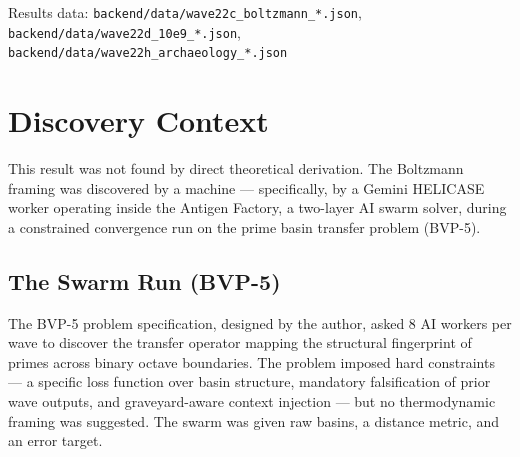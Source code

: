 \documentclass[
  11pt,
]{article}
\begin{document}
Results data: \texttt{backend/data/wave22c\_boltzmann\_*.json},
\texttt{backend/data/wave22d\_10e9\_*.json},
\texttt{backend/data/wave22h\_archaeology\_*.json}

\section{Discovery Context}\label{app:discovery}

This result was not found by direct theoretical derivation. The
Boltzmann framing was discovered by a machine --- specifically, by a
Gemini HELICASE worker operating inside the Antigen Factory, a two-layer
AI swarm solver, during a constrained convergence run on the prime basin
transfer problem (BVP-5).

\subsection{The Swarm Run (BVP-5)}\label{sec:swarm}

The BVP-5 problem specification, designed by the author, asked 8 AI
workers per wave to discover the transfer operator mapping the
structural fingerprint of primes across binary octave boundaries. The
problem imposed hard constraints --- a specific loss function over basin
structure, mandatory falsification of prior wave outputs, and
graveyard-aware context injection --- but no thermodynamic framing was
suggested. The swarm was given raw basins, a distance metric, and an
error target.
\end{document}
